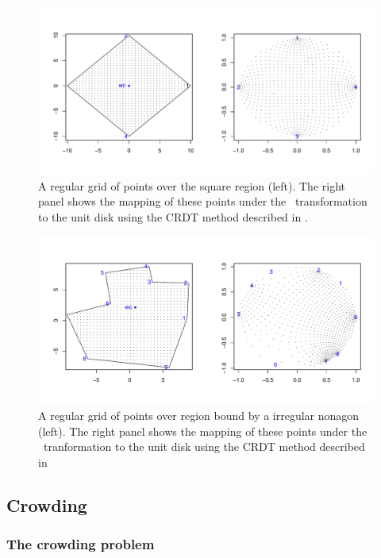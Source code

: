 \begin{figure} [bp]
\centering
\includegraphics[scale=0.5]{sc/figs/squaredomain.pdf}
\caption{A regular grid of points over the square region (left). The right panel shows the mapping of these points under the \sch\ transformation to the unit disk using the CRDT method described in .}
\label{squaredomain}
\end{figure}

\begin{figure} [tbp]
\centering
\includegraphics[scale=0.5]{sc/figs/irregulardomain.pdf}
\caption{A regular grid of points over region bound by a irregular nonagon (left). The right panel shows the mapping of these points under the \sch\ tranformation to the unit disk using the CRDT method described in }
\label{irregdomain}
\end{figure}

\subsection{Crowding}
\label{sch-crowding}

\subsubsection{The crowding problem}

